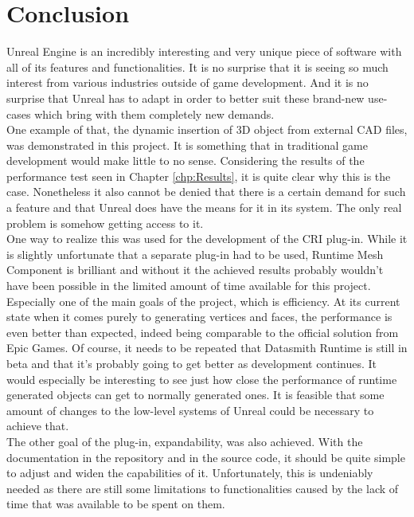 \chapter{Conclusion}\label{chp:Conclusion}

Unreal Engine is an incredibly interesting and very unique piece of software with all of its features and functionalities. It is no surprise that it is seeing so much interest from various industries outside of game development. And it is no surprise that Unreal has to adapt in order to better suit these brand-new use-cases which bring with them completely new demands.\\
One example of that, the dynamic insertion of 3D object from external CAD files, was demonstrated in this project. It is something that in traditional game development would make little to no sense. Considering the results of the performance test seen in Chapter \ref{chp:Results}, it is quite clear why this is the case. Nonetheless it also cannot be denied that there is a certain demand for such a feature and that Unreal does have the means for it in its system. The only real problem is somehow getting access to it.\\
One way to realize this was used for the development of the \acs{CRI} plug-in. While it is slightly unfortunate that a separate plug-in had to be used, Runtime Mesh Component is brilliant and without it the achieved results probably wouldn't have been possible in the limited amount of time available for this project. Especially one of the main goals of the project, which is efficiency. At its current state when it comes purely to generating vertices and faces, the performance is even better than expected, indeed being comparable to the official solution from Epic Games. Of course, it needs to be repeated that Datasmith Runtime is still in beta and that it's probably going to get better as development continues. It would especially be interesting to see just how close the performance of runtime generated objects can get to normally generated ones. It is feasible that some amount of changes to the low-level systems of Unreal could be necessary to achieve that.\\
The other goal of the plug-in, expandability, was also achieved. With the documentation in the repository and in the source code, it should be quite simple to adjust and widen the capabilities of it. Unfortunately, this is undeniably needed as there are still some limitations to functionalities caused by the lack of time that was available to be spent on them.\\
